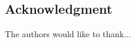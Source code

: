 \documentclass[journal]{IEEEtran}
\begin{document}
\begin{multicols}{2}
\section*{Acknowledgment}


The authors would like to thank...


\ifCLASSOPTIONcaptionsoff
\newpage
\fi







%



% 


\end{multicols}
\end{document}
